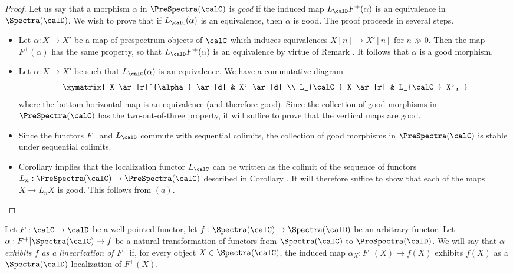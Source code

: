 \begin{proof}
Let us say that a morphism $\alpha$ in $\PreSpectra(\calC)$ is {\it good} if
the induced map $L_{\calD} F^{+}(\alpha)$ is an equivalence in $\Spectra(\calD)$.
We wish to prove that if $L_{\calC}(\alpha)$ is an equivalence, then $\alpha$ is good.
The proof proceeds in several steps.
\begin{itemize}
\item[$(a)$] Let $\alpha: X \rightarrow X'$ be a map of prespectrum objects of $\calC$ which
induces equivalences $X[n] \rightarrow X'[n]$ for $n \gg 0$. Then the map $F^{+}(\alpha)$
has the same property, so that $L_{\calD} F^{+}(\alpha)$ is an equivalence by virtue of
Remark . It follows that $\alpha$ is a good morphism.
\item[$(b)$] Let $\alpha: X \rightarrow X'$ be such that $L_{\calC}(\alpha)$ is an equivalence. We have a commutative diagram $$ \xymatrix{ X \ar[r]^{\alpha} \ar[d] & X' \ar[d] \\
L_{\calC} X \ar[r] & L_{\calC} X', }$$
where the bottom horizontal map is an equivalence (and therefore good). Since the collection of
good morphisms in $\PreSpectra(\calC)$ has the two-out-of-three property, it will suffice to prove
that the vertical maps are good.
\item[$(c)$] Since the functors $F^{+}$ and $L_{\calD}$ commute with sequential colimits,
the collection of good morphisms in $\PreSpectra(\calC)$ is stable under sequential colimits.
\item[$(d)$] Corollary  implies that the localization functor $L_{\calC}$
can be written as the colimit of the sequence of functors $L_{n}: \PreSpectra(\calC) \rightarrow
\PreSpectra(\calC)$ described in Corollary . It will therefore suffice to show that
each of the maps $X \rightarrow L_n X$ is good. This follows from $(a)$.
\end{itemize}
\end{proof}

\begin{definition}\label{cool}
Let $F: \calC \rightarrow \calD$ be a well-pointed functor, let $f: \Spectra(\calC) \rightarrow \Spectra(\calD)$ be an arbitrary functor. Let $\alpha: F^{+}| \Spectra(\calC) \rightarrow f$ be a natural transformation of functors from $\Spectra(\calC)$ to $\PreSpectra(\calD)$. We will say that $\alpha$
{\it exhibits $f$ as a linearization of $F^{+}$} if, for every object $X \in \Spectra(\calC)$, the induced map $\alpha_{X}: F^{+}(X) \rightarrow f(X)$ exhibits $f(X)$ as a $\Spectra(\calD)$-localization of
$F^{+}(X)$.
\end{definition}

